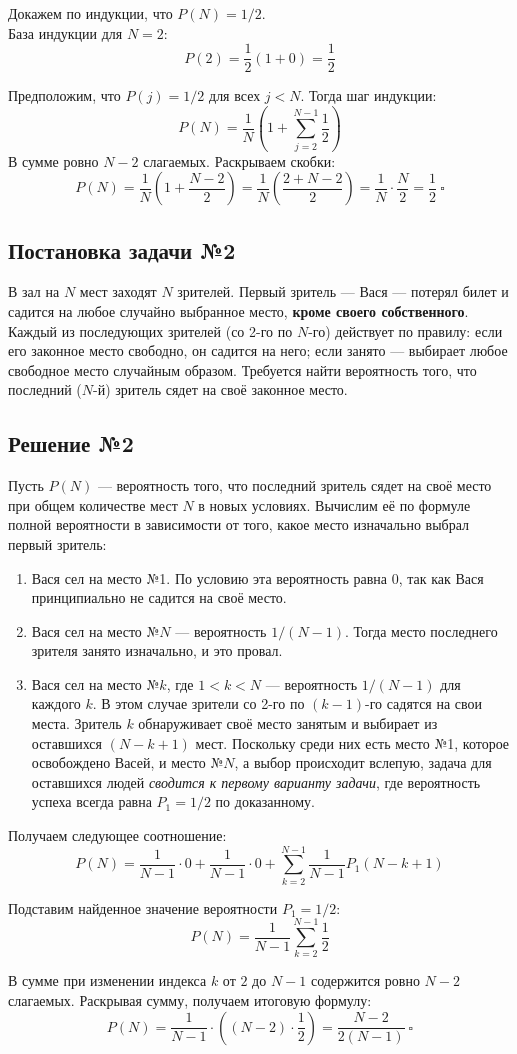 \documentclass[12pt]{article}
\begin{document}
Докажем по индукции, что $P(N) = 1/2$.\\
База индукции для $N=2$: 
$$ P(2) = \frac{1}{2} (1 + 0) = \frac{1}{2} $$

Предположим, что $P(j) = 1/2$ для всех $j < N$. Тогда шаг индукции:
$$ P(N) = \frac{1}{N} \left( 1 + \sum_{j=2}^{N-1} \frac{1}{2} \right) $$
В сумме ровно $N - 2$ слагаемых. Раскрываем скобки:
$$ P(N) = \frac{1}{N} \left( 1 + \frac{N - 2}{2} \right) = \frac{1}{N} \left( \frac{2 + N - 2}{2} \right) = \frac{1}{N} \cdot \frac{N}{2} = \frac{1}{2}\ \square $$

\subsection*{Постановка задачи №2}
В зал на $N$ мест заходят $N$ зрителей. Первый зритель --- Вася --- потерял билет и садится на любое случайно выбранное место, \textbf{кроме своего собственного}. Каждый из последующих зрителей (со 2-го по $N$-го) действует по правилу: если его законное место свободно, он садится на него; если занято — выбирает любое свободное место случайным образом. Требуется найти вероятность того, что последний ($N$-й) зритель сядет на своё законное место.

\subsection*{Решение №2}
Пусть $P(N)$ — вероятность того, что последний зритель сядет на своё место при общем количестве мест $N$ в новых условиях. Вычислим её по формуле полной вероятности в зависимости от того, какое место изначально выбрал первый зритель:

\begin{enumerate}
    \item Вася сел на место №1. По условию эта вероятность равна $0$, так как Вася принципиально не садится на своё место.
    \item Вася сел на место №$N$ --- вероятность $1/(N-1)$. Тогда место последнего зрителя занято изначально, и это провал.
    \item Вася сел на место №$k$, где $1 < k < N$ --- вероятность $1/(N-1)$ для каждого $k$. В этом случае зрители со 2-го по $(k-1)$-го садятся на свои места. Зритель $k$ обнаруживает своё место занятым и выбирает из оставшихся $(N - k + 1)$ мест. Поскольку среди них есть место №1, которое освобождено Васей, и место №$N$, а выбор происходит вслепую, задача для оставшихся людей \textit{сводится к первому варианту задачи}, где вероятность успеха всегда равна $P_1 = 1/2$ по доказанному.
\end{enumerate}

Получаем следующее соотношение:
$$ P(N) = \frac{1}{N-1} \cdot 0 + \frac{1}{N-1} \cdot 0 + \sum_{k=2}^{N-1} \frac{1}{N-1} P_1(N - k + 1) $$

Подставим найденное значение вероятности $P_1 = 1/2$:
$$ P(N) = \frac{1}{N-1} \sum_{k=2}^{N-1} \frac{1}{2} $$

В сумме при изменении индекса $k$ от $2$ до $N-1$ содержится ровно $N - 2$ слагаемых. Раскрывая сумму, получаем итоговую формулу:
$$ P(N) = \frac{1}{N-1} \cdot \left( (N - 2) \cdot \frac{1}{2} \right) = \frac{N - 2}{2(N - 1)}\ \square $$
\end{document}

